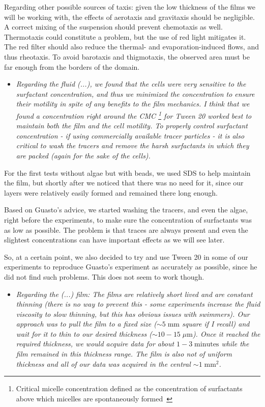 Regarding other possible sources of taxis: given the low thickness of the films we will be working with, the effects of aerotaxis and gravitaxis should be negligible. A correct mixing of the suspension should prevent chemotaxis as well. Thermotaxis could constitute a problem, but the use of red light mitigates it. The red filter should also reduce the thermal- and evaporation-induced flows, and thus rheotaxis. To avoid barotaxis and thigmotaxis, the observed area must be far enough from the borders of the domain. 

\begin{itemize}
	\item \textit{Regarding the fluid (...), we found that the cells were very sensitive to the surfactant concentration, and thus we minimized the concentration to ensure their motility in spite of any benefits to the film mechanics. I think that we found a concentration right around the CMC \footnote{Critical micelle concentration defined as the concentration of surfactants above which micelles are spontaneously formed~\cite{Sheng2011}} for Tween 20 worked best to maintain both the film and the cell motility. To properly control surfactant concentration - if using commercially available tracer particles - it is also critical to wash the tracers and remove the harsh surfactants in which they are packed (again for the sake of the cells).}
\end{itemize}

For the first tests without algae but with beads, we used SDS to help maintain the film, but shortly after we noticed that there was no need for it, since our layers were relatively easily formed and remained there long enough.

Based on Guasto's advice, we started washing the tracers, and even the algae, right before the experiments, to make sure the concentration of surfactants was as low as possible. The problem is that traces are always present and even the slightest concentrations can have important effects as we will see later.

So, at a certain point, we also decided to try and use Tween 20 in some of our experiments to reproduce Guasto's experiment as accurately as possible, since he did not find such problems. This does not seem to work though.

\begin{itemize}
	\item \textit{Regarding the (...) film: The films are relatively short lived and are constant thinning (there is no way to prevent this - some experiments increase the fluid viscosity to slow thinning, but this has obvious issues with swimmers). Our approach was to pull the film to a fixed size ($ \sim 5 \; \textrm{mm}$ square if I recall) and wait for it to thin to our desired thickness ($ \sim 10-15 \; \mu \textrm{m} $). Once it reached the required thickness, we would acquire data for about $1-3 \; \textrm{minutes}$ while the film remained in this thickness range. The film is also not of uniform thickness and all of our data was acquired in the central $ \sim 1 \; \textrm{mm}^2 $.}
\end{itemize}

